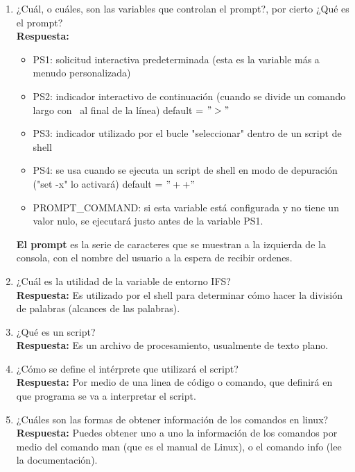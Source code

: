 \documentclass[a4paper, 11pt, oneside]{article}
\begin{document}
\begin{enumerate}
    \item ¿Cuál, o cuáles, son las variables que controlan el prompt?, por cierto ¿Qué es el
    prompt?\\
    \textbf{Respuesta:}
    \begin{itemize}
        \item PS1: solicitud interactiva predeterminada (esta es la variable más a menudo personalizada)
        \item PS2: indicador interactivo de continuación (cuando se divide un comando largo con \ al final de la línea) default = $">"$
        \item PS3: indicador utilizado por el bucle "seleccionar" dentro de un script de shell
        \item PS4: se usa cuando se ejecuta un script de shell en modo de depuración ("set -x" lo activará) default = $"++"$
        \item PROMPT\_COMMAND: si esta variable está configurada y no tiene un valor nulo, se ejecutará justo antes de la variable PS1.
    \end{itemize}
    \textbf{El prompt} es la serie de caracteres que se muestran a la izquierda de la consola, con el nombre del usuario a la espera de recibir ordenes.
    \item ¿Cuál es la utilidad de la variable de entorno IFS?\\
    \textbf{Respuesta:} Es utilizado por el shell para determinar cómo hacer la división de palabras (alcances de las palabras).
    \item ¿Qué es un script?\\
    \textbf{Respuesta:} Es un archivo de procesamiento, usualmente de texto plano.
    
    \item ¿Cómo se define el intérprete que utilizará el script?\\
    \textbf{Respuesta:} Por medio de una linea de código o comando, que definirá en que programa se va a interpretar el script.
    
    \item ¿Cuáles son las formas de obtener información de los comandos en linux?\\
    \textbf{Respuesta:} Puedes obtener uno a uno la información de los comandos por medio del comando man (que es el manual de Linux), o el comando info (lee la documentación).
    

\end{enumerate}
\end{document}
